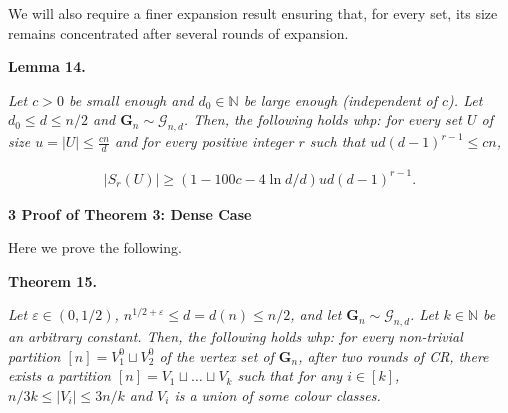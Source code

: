 


We will also require a finer expansion result ensuring that, for every set, its size remains concentrated after several rounds of expansion.\par





\par\medskip\noindent\textbf{
\textbf{Lemma 14}\textbf{.}
}\par



\emph{Let $c>0$ be small enough and $d_{0}\in\mathbb{N}$ be large enough (independent of $c$). Let $d_{0}\leq d\leq n/2$ and $\mathbf{G}_{n}\sim\mathcal{G}_{n,d}$. Then, the following holds whp:
for every set $U$ of size $u=|U|\leq\frac{cn}{d}$ and for every positive integer $r$ such that $ud(d-1)^{r-1}\leq cn$,}\par


\[\begin{gathered}
|S_{r}(U)|\geq(1-100c-4\ln d/d)ud(d-1)^{r-1}.
\end{gathered}\]








\par\medskip\noindent\textbf{
3 Proof of Theorem 3: Dense Case}\par




Here we prove the following.\par





\par\medskip\noindent\textbf{
\textbf{Theorem 15}\textbf{.}
}\par



\emph{Let $\varepsilon\in(0,1/2)$, $n^{1/2+\varepsilon}\leq d=d(n)\leq n/2$, and let $\mathbf{G}_{n}\sim\mathcal{G}_{n,d}$. Let $k\in\mathbb{N}$ be an arbitrary constant. Then, the following holds whp: for every non-trivial partition $[n]=V_{1}^{0}\sqcup V_{2}^{0}$ of the vertex set of $\mathbf{G}_{n}$, after two rounds of CR, there exists a partition $[n]=V_{1}\sqcup\ldots\sqcup V_{k}$ such that for any $i\in[k]$, $n/3k\leq|V_{i}|\leq 3n/k$ and $V_{i}$ is a union of some colour classes.}\par



